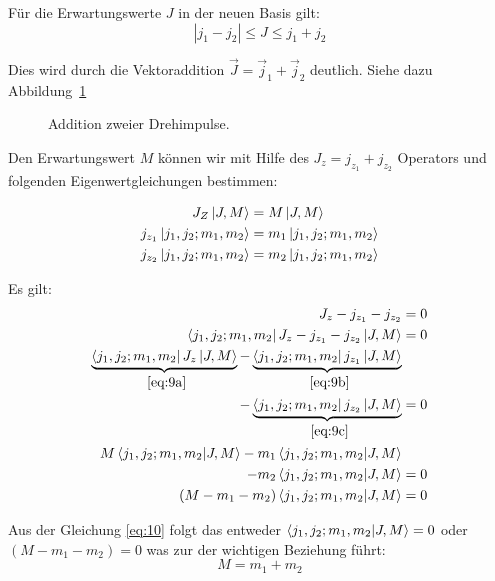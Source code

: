 Für die Erwartungswerte \(J\) in der neuen Basis gilt:
\begin{equation}
  \label{eq:8}
  \boxed{|j_1-j_2|\leq J\leq j_1+j_2}
\end{equation}

Dies wird durch die Vektoraddition \(\vec J = \vec j_1+\vec j_2\) deutlich.
Siehe dazu Abbildung~\ref{fig:1}
\begin{figure}[!ht]
  \begin{center}
    
    \caption{Addition zweier Drehimpulse.}
    \label{fig:1}
  \end{center}
\end{figure}

Den Erwartungswert \(M\) können wir mit Hilfe des \(J_z=j_{z_1}+j_{z_2}\)
Operators und folgenden Eigenwertgleichungen bestimmen:

\begin{subequations}
  \begin{align}
    J_Z\left| J,M \right\rangle&= M \left| J,M \right\rangle \label{eq:9a}\\
    j_{z_1}\left| j_1,j_2;m_1,m_2 \right\rangle&=m_1\left| j_1,j_2;m_1,m_2 \right\rangle \label{eq:9b}\\
    j_{z_2}\left| j_1,j_2;m_1,m_2 \right\rangle&=m_2\left| j_1,j_2;m_1,m_2 \right\rangle \label{eq:9c}
  \end{align}
\end{subequations}

Es gilt:
\begin{align}
  \label{eq:10}
  J_z-j_{z_1}-j_{z_2}&=0\notag\\
  \bra{j_1,j_2;m_1,m_2} J_z-j_{z_1}-j_{z_2} \ket{J,M} &=0\notag\\
  \underbrace{\bra{j_1,j_2;m_1,m_2} J_z\ket{J,M}}_{~\eqref{eq:9a}}
  -\underbrace{\bra{j_1,j_2;m_1,m_2}j_{z_1}\ket{J,M}}_{~\eqref{eq:9b}}\notag\\
  -\underbrace{\bra{j_1,j_2;m_1,m_2}j_{z_2} \ket{J,M}}_{~\eqref{eq:9c}}&=0\notag\\
  M\braket{j_1,j_2;m_1,m_2}{J,M}
  -m_1\braket{j_1,j_2;m_1,m_2}{J,M}\notag\\
  -m_2\braket{j_1,j_2;m_1,m_2}{J,M}&=0\notag\\
  (M-m_1-m_2)\braket{j_1,j_2;m_1,m_2}{J,M}&=0
\end{align}

Aus der Gleichung \eqref{eq:10} folgt das entweder
\(\braket{j_1,j_2;m_1,m_2}{J,M}=0\) oder\\ 
\((M-m_1-m_2)=0\) was zur der wichtigen Beziehung führt:
\begin{equation}
  \label{eq:9}
  \boxed{M=m_1+m_2}
\end{equation}


